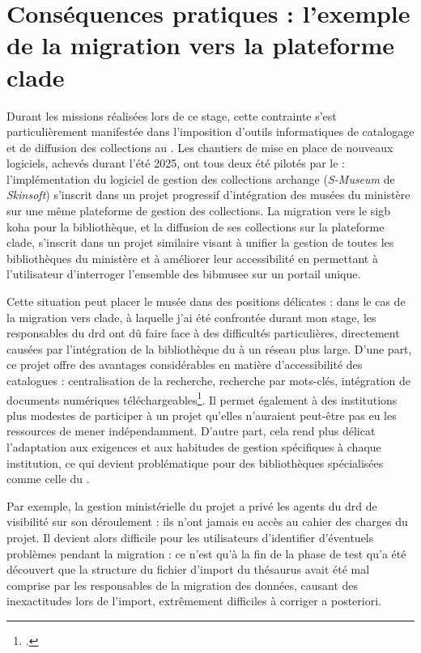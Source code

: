 \section{\label{I-B-2}Conséquences pratiques : l'exemple de la migration vers la plateforme \gls{clade}}

Durant les missions réalisées lors de ce stage, cette contrainte s'est particulièrement manifestée dans l'imposition d'outils informatiques de catalogage et de diffusion des collections au \mae. Les chantiers de mise en place de nouveaux logiciels, achevés durant l'été 2025, ont tous deux été pilotés par le \minarm : l'implémentation du logiciel de gestion des collections \gls{archange} (\textit{S-Museum} de \textit{Skinsoft}) s'inscrit dans un projet progressif d'intégration des musées du ministère sur une même plateforme de gestion des collections. La migration vers le \ac{sigb} \gls{koha} pour la bibliothèque, et la diffusion de ses collections sur la plateforme \gls{clade}, s'inscrit dans un projet similaire visant à unifier la gestion de toutes les bibliothèques du ministère et à améliorer leur accessibilité en permettant à l'utilisateur d'interroger l'ensemble des \gls{bibmusee} sur un portail unique.

Cette situation peut placer le musée dans des positions délicates : dans le cas de la migration vers \gls{clade}, à laquelle j'ai été confrontée durant mon stage, les responsables du \ac{drd} ont dû faire face à des difficultés particulières, directement causées par l'intégration de la bibliothèque du \mae à un réseau plus large. D'une part, ce projet offre des avantages considérables en matière d'accessibilité des catalogues : centralisation de la recherche, recherche par mots-clés, intégration de documents numériques téléchargeables\footcite{ministeredesarmeesKitCommunicationCLADE}. Il permet également à des institutions plus modestes de participer à un projet qu'elles n'auraient peut-être pas eu les ressources de mener indépendamment. D'autre part, cela rend plus délicat l'adaptation aux exigences et aux habitudes de gestion spécifiques à chaque institution, ce qui devient problématique pour des bibliothèques spécialisées comme celle du \mae.

Par exemple, la gestion ministérielle du projet a privé les agents du \ac{drd} de visibilité sur son déroulement : ils n'ont jamais eu accès au cahier des charges du projet. Il devient alors difficile pour les utilisateurs d'identifier d'éventuels problèmes pendant la migration : ce n'est qu'à la fin de la phase de test qu'a été découvert que la structure du fichier d'import du thésaurus avait été mal comprise par les responsables de la migration des données, causant des inexactitudes lors de l'import, extrêmement difficiles à corriger a posteriori.

